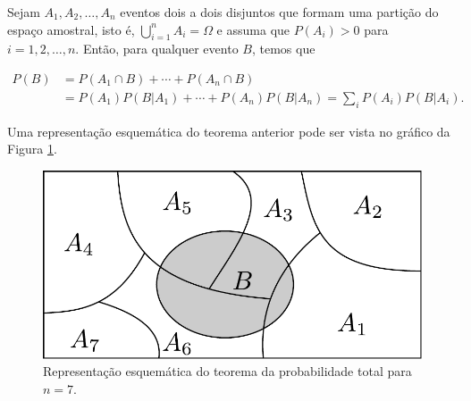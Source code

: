 \begin{frame}
\begin{teo} 
\label{teoBayes}
Sejam $A_1, A_2, \ldots, A_n$ eventos dois a dois disjuntos que formam uma partição do espaço amostral, isto é, $ \displaystyle \bigcup_{i=1}^nA_i=\Omega $ e assuma que $P(A_i) > 0$  para $i = 1, 2, \ldots, n.$ Então, para qualquer evento $B$, temos que

\[
\begin{aligned}
P(B)&=P(A_1\cap B) + \cdots + P( A_n \cap B) \\ &= P(A_1) P(B|A_1) + \cdots + P(A_n)P(B|A_n)= \displaystyle \sum_{i}P(A_i)P(B|A_i).
\end{aligned}
\] 	
\end{teo}
Uma representação esquemática do teorema anterior pode ser vista no gráfico da Figura \ref{fig5}.
\begin{figure}[!htb]
\begin{center}
\includegraphics[angle=0, scale=0.4]{fig5.pdf}
\end{center}
\caption{\label{fig5}  Representação esquemática do teorema da probabilidade total para $n=7$.}
\end{figure} 
 
\end{frame}


